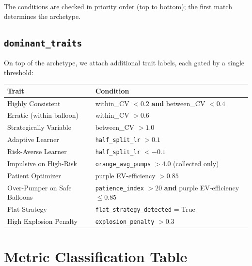 \documentclass[11pt,a4paper]{article}
\begin{document}
The conditions are checked in priority order (top to bottom); the first
match determines the archetype.


\subsection{\texttt{dominant\_traits}}

On top of the archetype, we attach additional trait labels, each gated by a
single threshold:

\begin{table}[H]
\centering
\begin{tabular}{@{}lp{7.5cm}@{}}
\toprule
\textbf{Trait} & \textbf{Condition} \\
\midrule
Highly Consistent          & within\_CV $< 0.2$ \textbf{and} between\_CV $< 0.4$ \\
Erratic (within-balloon)   & within\_CV $> 0.6$ \\
Strategically Variable     & between\_CV $> 1.0$ \\
Adaptive Learner           & \texttt{half\_split\_lr} $> 0.1$ \\
Risk-Averse Learner        & \texttt{half\_split\_lr} $< -0.1$ \\
Impulsive on High-Risk     & \texttt{orange\_avg\_pumps} $> 4.0$ (collected only) \\
Patient Optimizer          & purple EV-efficiency $> 0.85$ \\
Over-Pumper on Safe Balloons & \texttt{patience\_index} $> 20$ \textbf{and} purple EV-efficiency $\leq 0.85$ \\
Flat Strategy              & \texttt{flat\_strategy\_detected} = True \\
High Explosion Penalty     & \texttt{explosion\_penalty} $> 0.3$ \\
\bottomrule
\end{tabular}
\end{table}


\section{Metric Classification Table}
\label{sec:classification}
\end{document}
